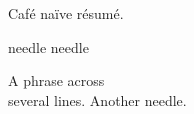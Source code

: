 \documentclass{article}
\begin{document}
Café naïve résumé.

needle needle

A phrase across\\
several lines.
\newpage
Another needle.
\end{document}
